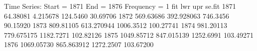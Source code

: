 \begin{Schunk}
\begin{Soutput}
Time Series:
Start = 1871 
End = 1876 
Frequency = 1 
            fit        lwr       upr    se.fit
1871   64.38081   4.215678  124.5460  30.69706
1872  569.63686 392.928063  746.3456  90.15920
1873  809.81105 613.270944 1006.3512 100.27741
1874  981.20113 779.675175 1182.7271 102.82126
1875 1049.85712 847.015139 1252.6991 103.49271
1876 1069.05730 865.863912 1272.2507 103.67200
\end{Soutput}
\end{Schunk}
